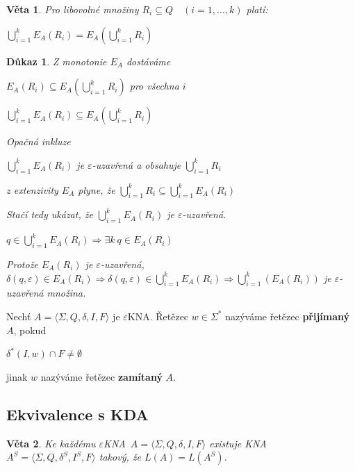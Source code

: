 \documentclass[10pt, a4paper, titlepage]{article}
\theoremstyle{note}
\newtheorem{veta}{\textbf{Věta}}
\newtheorem{dukaz}{\textbf{Důkaz}}
\newcommand{\ekna}{$\varepsilon$KNA} %
\begin{document}
\begin{veta}
Pro libovolné množiny $R_i \subseteq Q \quad (i=1,\ldots,k)$ platí:

$\bigcup_{i=1}^k E_A(R_i)=E_A(\bigcup_{i=1}^kR_i)$
\end{veta}

\begin{dukaz}
Z monotonie $E_A$ dostáváme

\quad$E_A(R_i) \subseteq E_A(\bigcup_{i=1}^k R_i)$ pro všechna $i$

\quad$\bigcup_{i=1}^kE_A(R_i) \subseteq E_A(\bigcup_{i=1}^k R_i)$

Opačná inkluze

\quad$\bigcup_{i=1}^kE_A(R_i)$ je $\varepsilon$-uzavřená a obsahuje $\bigcup_{i=1}^k R_i$

z extenzivity $E_A$ plyne, že $\bigcup_{i=1}^k R_i \subseteq \bigcup_{i=1}^k E_A(R_i)$

Stačí tedy ukázat, že $\bigcup_{i=1}^k E_A(R_i)$ je $\varepsilon$-uzavřená.

\quad$q \in \bigcup_{i=1}^k E_A(R_i) \Rightarrow \exists k \ q \in E_A(R_i)$

Protože $E_A(R_i)$ je $\varepsilon$-uzavřená, $\delta(q,\varepsilon) \in E_A(R_i) \Rightarrow \delta(q,\varepsilon) \in \bigcup_{i=1}^k E_A(R_i) \Rightarrow \bigcup_{i=1}^k(E_A(R_i))$ je $\varepsilon$-uzavřená množina.
\end{dukaz}

Nechť $A=\langle\Sigma,Q,\delta,I,F\rangle$ je \ekna. Řetězec $w \in \Sigma^*$ nazýváme řetězec \textbf{přijímaný} $A$, pokud

$\delta^*(I,w) \cap F \neq \emptyset$

jinak $w$ nazýváme řetězec \textbf{zamítaný} $A$.

\subsection{Ekvivalence s KDA}

\begin{veta}
Ke každému \ekna \ $A=\langle\Sigma,Q,\delta,I,F\rangle$ existuje KNA $A^S=\langle\Sigma,Q,\delta^S,I^S,F\rangle$ takový, že $L(A)=L(A^S)$.
\end{veta}
 
\end{document}
